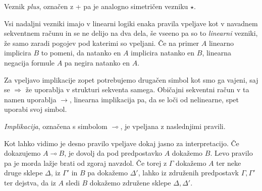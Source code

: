 \begin{definicija} \label{plus}
	Veznik \emph{plus}, označen z + pa je analogno simetričen vezniku $\star$.
	\begin{center}
        \begin{bprooftree}
        \end{bprooftree}
        \begin{bprooftree}
        \end{bprooftree}
    \end{center}
\end{definicija}

Vsi nadaljni vezniki imajo v linearni logiki enaka pravila vpeljave kot v navadnem sekventnem računu in se ne delijo na dva dela, še vseeno pa so to \emph{linearni} vezniki, že samo zaradi pogojev pod katerimi so vpeljani. Če na primer $A$ linearno implicira $B$ to pomeni, da natanko en $A$ implicira natanko en $B$, linearna negacija formule $A$ pa negira natanko en $A$.

Za vpeljavo implikacije zopet potrebujemo drugačen simbol kot smo ga vajeni, saj se $\Rightarrow$ že uporablja v strukturi sekventa samega. Običajni sekventni račun v ta namen uporablja $\rightarrow$, linearna implikacija pa, da se loči od nelinearne, spet uporabi svoj simbol.

\begin{definicija}
	\emph{Implikacija}, označena s simbolom $\multimap$, je vpeljana z naslednjimi pravili.
    \begin{center}
        \begin{bprooftree}
        \end{bprooftree}
        \begin{bprooftree}
        \end{bprooftree}
    \end{center}
    Kot lahko vidimo je desno pravilo vpeljave dokaj jasno za interpretacijo. Če dokazujemo $A \multimap B$, je dovolj da pod predpostavko $A$ dokažemo $B$. Levo pravilo pa je morda lažje brati od zgoraj navzdol. Če torej z $\Gamma$ dokažemo $A$ ter neke druge sklepe $\Delta$, iz $\Gamma'$ in $B$ pa dokažemo $\Delta'$, lahko iz združenih predpostavk $\Gamma,\Gamma'$ ter dejstva, da iz $A$ sledi $B$ dokažemo združene sklepe $\Delta,\Delta'$.
\end{definicija}

